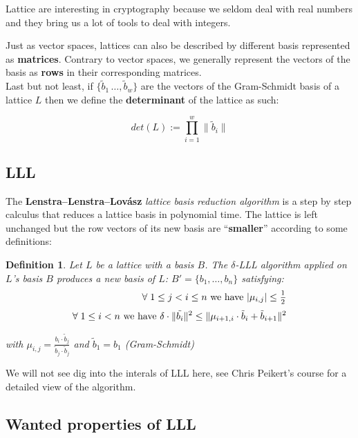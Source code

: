 \documentclass[a4paper,11pt]{article}
\newtheorem{definition}{Definition}
\begin{document}
Lattice are interesting in cryptography because we seldom deal with real numbers and they bring us a lot of tools to deal with integers.

Just as vector spaces, lattices can also be described by different basis represented as \textbf{matrices}. Contrary to vector spaces, we generally represent the vectors of the basis as \textbf{rows} in their corresponding matrices.\\

Last but not least, if $\{\tilde{b}_1\,\hdots,\tilde{b}_w\}$ are the vectors of the Gram-Schmidt basis of a lattice $L$ then we define the \textbf{determinant} of the lattice as such:

\[ det(L) := \prod_{i=1}^{w} \|\tilde{b}_i\| \]

\subsection{LLL}

The \textbf{Lenstra–Lenstra–Lovász} \textit{lattice basis reduction algorithm} is a step by step calculus that reduces a lattice basis in polynomial time. The lattice is left unchanged but the row vectors of its new basis are ``\textbf{smaller}'' according to some definitions:

\begin{definition}
Let $L$ be a lattice with a basis $B$. The $\delta$-LLL algorithm applied on $L$'s basis $B$ produces a new basis of $L$: $B' = \{b_1,\hdots,b_n\}$ satisfying:
\begin{eqnarray}
\forall \hspace{1mm} 1 \leq j < i \leq n \text{ we have } |\mu_{i,j}| \leq \frac{_1}{^2}\\
\forall \hspace{1mm} 1 \leq i < n \text{ we have } \delta \cdot \|\tilde{b_i}\|^2 \leq \| \mu_{i+1,i}\cdot \tilde{b}_i + \tilde{b}_{i + 1}\|^2
\end{eqnarray}
\begin{center}
with $\mu_{i,j} = \frac{b_i \cdot \tilde{b}_j}{\tilde{b}_j \cdot \tilde{b}_j}$ and $\tilde{b}_1 = b_1$ (Gram-Schmidt)
\end{center}
\end{definition}

We will not see dig into the interals of LLL here, see Chris Peikert's course\cite{chrispeikert} for a detailed view of the algorithm.

\subsection{Wanted properties of LLL}
\end{document}
